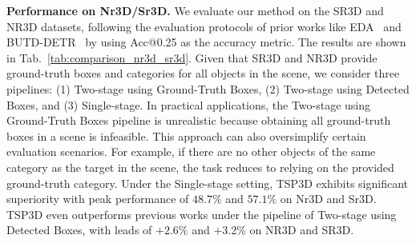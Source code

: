 \textbf{Performance on Nr3D/Sr3D.}
We evaluate our method on the SR3D and NR3D datasets, following the evaluation protocols of prior works like EDA~\citep{wu2023eda} and BUTD-DETR~\citep{jain2022bottom} by using Acc@0.25 as the accuracy metric. The results are shown in Tab.~\ref{tab:comparison_nr3d_sr3d}.
Given that SR3D and NR3D provide ground-truth boxes and categories for all objects in the scene, we consider three pipelines: (1) Two-stage using Ground-Truth Boxes, (2) Two-stage using Detected Boxes, and (3) Single-stage.
In practical applications, the Two-stage using Ground-Truth Boxes pipeline is unrealistic because obtaining all ground-truth boxes in a scene is infeasible. This approach can also oversimplify certain evaluation scenarios. For example, if there are no other objects of the same category as the target in the scene, the task reduces to relying on the provided ground-truth category.
Under the Single-stage setting, TSP3D exhibits significant superiority with peak performance of $48.7\%$ and $57.1\%$ on Nr3D and Sr3D. 
TSP3D even outperforms previous works under the pipeline of Two-stage using Detected Boxes, with leads of $+2.6\%$ and $+3.2\%$ on NR3D and SR3D.


